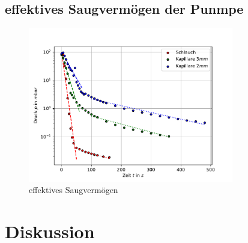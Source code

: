 \documentclass[11pt, a4paper]{article}
\begin{document}
    \subsection{effektives Saugvermögen der Punmpe}
    \begin{figure}[h]
        \centering
        \includegraphics[width=0.8\textwidth]{VAK/Saugver.pdf}
        \caption{effektives Saugvermögen}
        \label{fig:effSaug}
    \end{figure}

    \section{Diskussion}

    
    
\end{document}
